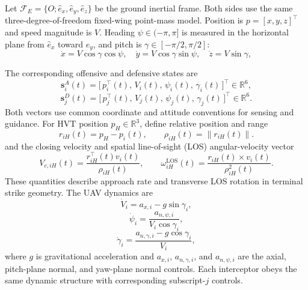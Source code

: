 \documentclass{cja}
\begin{document}
Let $\mathcal{F}_E=\{O;\hat{e}_x,\hat{e}_y,\hat{e}_z\}$ be the ground inertial frame. Both sides use the same three-degree-of-freedom fixed-wing point-mass model. Position is $p=[x,y,z]^\top$ and speed magnitude is $V$. Heading $\psi\in(-\pi,\pi]$ is measured in the horizontal plane from $\hat e_x$ toward $\hat e_y$, and pitch is $\gamma\in[-\pi/2,\pi/2]$:
\begin{equation}
\dot x = V\cos\gamma\cos\psi,\quad
\dot y = V\cos\gamma\sin\psi,\quad
\dot z = V\sin\gamma,
\label{eq:vel-decomp}
\end{equation}

The corresponding offensive and defensive states are
\begin{equation}
\mathbf s_i^{A}(t)=\bigl[\,p_i^\top(t),\,V_i(t),\,\psi_i(t),\,\gamma_i(t)\,\bigr]^\top\in\mathbb{R}^{6},
\label{eq:att-state}
\end{equation}
\begin{equation}
\mathbf s_j^{D}(t)=\bigl[\,p_j^\top(t),\,V_j(t),\,\psi_j(t),\,\gamma_j(t)\,\bigr]^\top\in\mathbb{R}^{6}.
\label{eq:def-state}
\end{equation}
Both vectors use common coordinate and attitude conventions for sensing and guidance.
For HVT position $p_H\in\mathbb{R}^3$, define relative position and range
\begin{equation}
r_{iH}(t)=p_H-p_i(t),\qquad
\rho_{iH}(t)=\|r_{iH}(t)\|.
\label{eq:riH-def}
\end{equation}
and the closing velocity and spatial line-of-sight (LOS) angular-velocity vector
\begin{equation}
V_{c,iH}(t)=\frac{r_{iH}^{\top}(t)v_i(t)}{\rho_{iH}(t)},\qquad
\omega_{iH}^{\mathrm{LOS}}(t)=\frac{r_{iH}(t)\times v_i(t)}{\rho_{iH}^2(t)}.
\label{eq:hvt_kinematics_def}
\end{equation}
These quantities describe approach rate and transverse LOS rotation in terminal strike geometry.
The UAV dynamics are
\begin{equation}
\dot V_i=a_{x,i}-g\sin\gamma_i,
\label{eq:dyn-V}
\end{equation}
\begin{equation}
\dot\psi_i=\frac{a_{n,\psi,i}}{V_i\cos\gamma_i},
\label{eq:dyn-psi}
\end{equation}
\begin{equation}
\dot\gamma_i=\frac{a_{n,\gamma,i}-g\cos\gamma_i}{V_i},
\label{eq:dyn-gamma}
\end{equation}
where $g$ is gravitational acceleration and $a_{x,i}$, $a_{n,\gamma,i}$, and $a_{n,\psi,i}$ are the axial, pitch-plane normal, and yaw-plane normal controls. Each interceptor obeys the same dynamic structure with corresponding subscript-$j$ controls.
\end{document}

